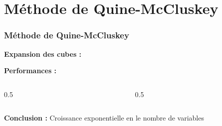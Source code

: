 \documentclass[handout]{beamer}
\newcommand{\tick}{\ding{52}}
\begin{document}
\section{M\'ethode de Quine-McCluskey}
\begin{frame}
  \frametitle{M\'ethode de Quine-McCluskey}
  
  \textbf{Expansion des cubes :}
  
     \begin{tikzpicture}[scale=2]
     
     \end{tikzpicture}
     \vfill\null

  \textbf{Performances :}     
     
     \begin{columns}
     	\begin{column}[t]{0.5\hsize}
	     \begin{tikzpicture}[scale=0.8]
    	 
	     \end{tikzpicture}
	     \end{column}

     
	     \begin{column}[t]{0.5\hsize}
	     \begin{tikzpicture}[scale=0.8]
    	 
	     \end{tikzpicture}
    	 \end{column} 
	  \end{columns}
	  
	\vfill\null
	\textbf{Conclusion : } Croissance exponentielle en le nombre de variables
	  
%
%  
  
  
  
\end{frame}
\end{document}
